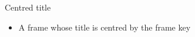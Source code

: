 \begin{standardframe}[t,titlealign=center]{Centred title}
	\begin{itemize}
		\item A frame whose title is centred by the frame key
	\end{itemize}
\end{standardframe}
